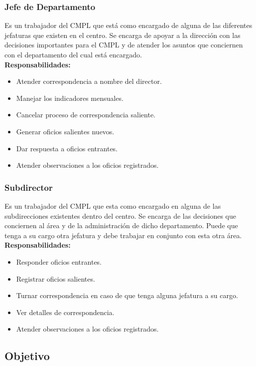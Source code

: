 \subsubsection{Jefe de Departamento}
Es un trabajador del CMPL que está como encargado de alguna de las diferentes jefaturas que existen en el centro. Se encarga de apoyar a la dirección con las decisiones importantes para el CMPL y de atender los asuntos que conciernen con el departamento del cual está encargado.\\

\textbf{Responsabilidades:}
\begin{itemize}
	\item Atender correspondencia a nombre del director.
	\item Manejar los indicadores mensuales.
	\item Cancelar proceso de correspondencia saliente.
	\item Generar oficios salientes nuevos.
	\item Dar respuesta a oficios entrantes.
	\item Atender observaciones a los oficios registrados.
\end{itemize}

\subsubsection{Subdirector}
Es un trabajador del CMPL que esta como encargado en alguna de las subdirecciones existentes dentro del centro. Se encarga de las decisiones que conciernen al área y de la administración de dicho departamento. Puede que tenga a su cargo otra jefatura y debe trabajar en conjunto con esta otra área.\\ 

\textbf{Responsabilidades:}
\begin{itemize}
	\item Responder oficios entrantes.
	\item Registrar oficios salientes.
	\item Turnar correspondencia en caso de que tenga alguna jefatura a su cargo.
	\item Ver detalles de correspondencia.
	\item Atender observaciones a los oficios registrados.
\end{itemize}


\subsection{Objetivo}

